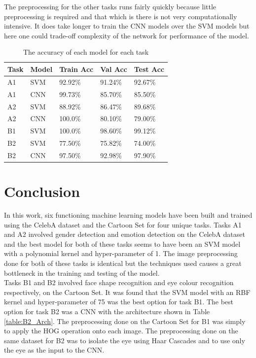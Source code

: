 \documentclass{article}
\begin{document}
  	The preprocessing for the other tasks runs fairly quickly because little preprocessing is required and that which is there is not very computationally intensive. It does take longer to train the CNN models over the SVM models but here one could trade-off complexity of the network for performance of the model. 
    \begin{table}[]
    \begin{tabular}{@{}lllll@{}}
    \toprule
    Task & Model & Train Acc & Val Acc & Test Acc \\ \midrule
    A1   & SVM   & 92.92\%   & 91.24\% & 92.67\%         \\
    A1   & CNN   & 99.73\%   & 85.70\% & 85.50\%         \\
    A2   & SVM   & 88.92\%   & 86.47\% & 89.68\%         \\
    A2   & CNN   & 100.0\%   & 80.10\% & 79.00\%         \\
    B1   & SVM   & 100.0\%	 & 98.60\% & 99.12\%		 \\
    B2   & SVM	 & 77.50\%	 & 75.82\% & 74.00\%		 \\
    B2   & CNN	 & 97.50\%	 & 92.98\% & 97.90\%		 \\ \bottomrule
    \end{tabular}
	\caption{The accuracy of each model for each task}
	\label{table:results}
    \end{table}

\section{Conclusion}
\label{sec:conc}
    In this work, six functioning machine learning models have been built and trained using the CelebA dataset and the Cartoon Set for four unique tasks. Tasks A1 and A2 involved gender detection and emotion detection on the CelebA dataset and the best model for both of these tasks seems to have been an SVM model with a polynomial kernel and hyper-parameter of 1. The image preprocessing done for both of these tasks is identical but the techniques used causes a great bottleneck in the training and testing of the model.\\
    
    Tasks B1 and B2 involved face shape recognition and eye colour recognition respectively, on the Cartoon Set. It was found that the SVM model with an RBF kernel and hyper-parameter of 75 was the best option for task B1. The best option for task B2 was a CNN with the architecture shown in Table \ref{table:B2_Arch}. The preprocessing done on the Cartoon Set for B1 was simply to apply the HOG operation onto each image. The preprocessing done on the same dataset for B2 was to isolate the eye using Haar Cascades and to use only the eye as the input to the CNN.



\end{document}
